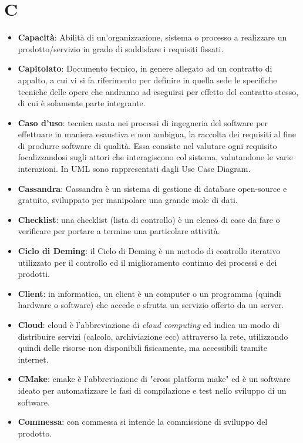 \documentclass[a4paper, oneside, openany, dvipsnames, table]{article}
\begin{document}
\section{C}
\begin{itemize} 
\item \textbf{Capacità}: Abilità di un'organizzazione, sistema o processo a realizzare un prodotto/servizio in grado di soddisfare i requisiti fissati.
\item \textbf{Capitolato}: Documento tecnico, in genere allegato ad un contratto di appalto, a cui vi si fa riferimento per definire in quella sede le specifiche tecniche delle opere che andranno ad eseguirsi per effetto del contratto stesso, di cui è solamente parte integrante.
\item \textbf{Caso d'uso}: tecnica usata nei processi di ingegneria del software per effettuare in maniera esaustiva
e non ambigua, la raccolta dei requisiti al fine di produrre software di qualità. Essa consiste nel valutare ogni requisito focalizzandosi sugli attori che interagiscono col sistema,
valutandone le varie interazioni. In UML sono rappresentati dagli Use Case Diagram.
\item \textbf{Cassandra}: Cassandra è un sistema di gestione di database  open-source e gratuito, sviluppato per manipolare una grande mole di dati.
\item \textbf{Checklist}: una checklist  (lista di controllo) è un elenco di cose da fare o verificare per portare a termine una particolare attività.
\item \textbf{Ciclo di Deming}: il Ciclo di Deming è un metodo di controllo iterativo utilizzato per il controllo ed il miglioramento continuo dei processi e dei prodotti.
\item \textbf{Client}: in informatica, un client è un computer o un programma (quindi hardware o software) che accede e sfrutta un servizio offerto da un server.
\item \textbf{Cloud}: cloud è l'abbreviazione di \textit{cloud computing} ed indica un modo di distribuire servizi (calcolo, archiviazione ecc) attraverso la rete, utilizzando quindi delle risorse non disponibili fisicamente, ma accessibili tramite internet.
\item \textbf{CMake}: cmake è l'abbreviazione di "cross platform make" ed è un software ideato per automatizzare le fasi di compilazione e test nello sviluppo di un software.
\item \textbf{Commessa}: con commessa si intende la commissione di sviluppo del prodotto.

\end{itemize}
\end{document}
